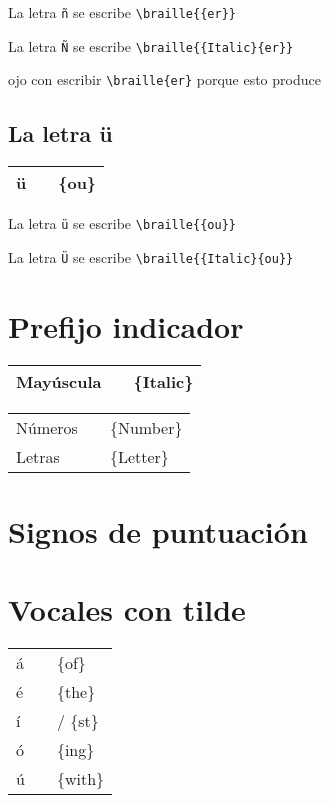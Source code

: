 \documentclass[draft]{article}
\newcommand{\mytildetable}[1]{%
	\enskip\begin{tabular}[t]{l|r|l} 
		\hline #1 \hline
	\end{tabular}\enskip}
\begin{document}
La letra \texttt{ñ} se escribe \verb|\braille{{er}}|


La letra \texttt{Ñ} se escribe \verb|\braille{{Italic}{er}}|


ojo con escribir  \verb|\braille{er}| porque esto produce



\subsection{La letra ü}

\begin{center}
	\mytildetable{
		ü & \braille{{ou}}     & \{ou\} \\
	}
\end{center}

La letra \texttt{ü} se escribe \verb|\braille{{ou}}|


La letra \texttt{Ü} se escribe \verb|\braille{{Italic}{ou}}|



\section{Prefijo indicador}

\begin{center}
	\mytildetable{
		Mayúscula&\braille{{Italic}}  & \{Italic\}   \\
	}
	\mytildetable{
		Números &\braille{{Number}} & \{Number\} \\	
		Letras  &\braille{{Letter}} & \{Letter\} \\
	}
\end{center}

\section{Signos de puntuación}








\section{Vocales con tilde}

\begin{center}
	\mytildetable{
		á &\braille{{of}}    & \{of\}      \\
		é &\braille{{the}}   & \{the\}     \\
		í&\braille{{st}}     & / \{st\}  \\
		ó&\braille{{ing}}    & \{ing\}  \\
		ú&\braille{{with}}   & \{with\}    \\
	}
\end{center}
\end{document}

